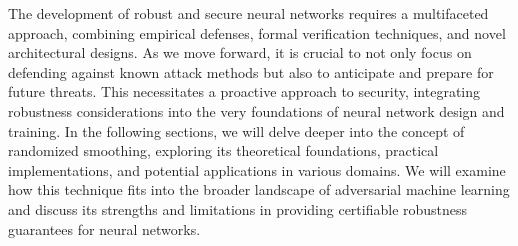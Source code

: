 The development of robust and secure neural networks requires a multifaceted approach, combining empirical defenses, formal verification techniques, and novel architectural designs.
As we move forward, it is crucial to not only focus on defending against known attack methods but also to anticipate and prepare for future threats.
This necessitates a proactive approach to security, integrating robustness considerations into the very foundations of neural network design and training.
In the following sections, we will delve deeper into the concept of randomized smoothing, exploring its theoretical foundations, practical implementations, and potential applications in various domains.
We will examine how this technique fits into the broader landscape of adversarial machine learning and discuss its strengths and limitations in providing certifiable robustness guarantees for neural networks.
